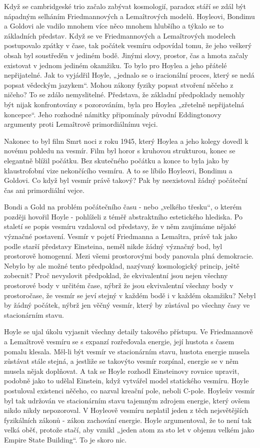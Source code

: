   Když se cambridgeské trio začalo zabývat kosmologií, paradox stáří se zdál být nápadným selháním
  Friedmannových a Lemaîtrových modelů. Hoyleovi, Bondimu a Goldovi ale vadilo mnohem více něco
  mnohem hlubšího a týkalo se to základních představ. Když se ve Friedmannových a Lemaîtrových
  modelech postupovalo zpátky v čase, tak počátek vesmíru odpovídal tomu, že jeho veškerý obsah byl
  soustředěn v jediném bodě. Jinými slovy, prostor, čas a hmota začaly existovat v jednom jediném
  okamžiku. To bylo pro Hoylea a jeho přátelé nepřijatelné. Jak to vyjádřil Hoyle, „jednalo se o
  iracionální proces, který se nedá popsat vědeckým jazykem“. Mohou zákony fyziky popsat stvoření
  něčeho z ničeho? To se zdálo nemyslitelné. Představa, že základní předpoklady nemohly být nijak
  konfrontovány s pozorováním, byla pro Hoylea „zřetelně nepřijatelná koncepce“. Jeho rozhodné
  námitky připomínaly původní Eddingtonovy argumenty proti Lemaîtrově primordiálnímu vejci. 

  Nakonec to byl film Smrt noci z roku 1945, který Hoylea a jeho kolegy dovedl k novému pohledu na
  vesmír. Film byl horor s kruhovou strukturou, konec se elegantně blížil počátku. Bez skutečného
  počátku a konce to byla jako by klaustrofobní vize nekončícího vesmíru. A to se líbilo Hoyleovi,
  Bondimu a Goldovi. Co když byl vesmír právě takový? Pak by neexistoval žádný počáteční čas ani
  primordiální vejce. 

  Bondi a Gold na problém počátečního času - nebo „velkého třesku“, o kterém později hovořil Hoyle -
  pohlíželi z téměř abstraktního estetického hlediska. Po staletí se popis vesmíru vzdaloval od
  představy, že v něm zaujímáme nějaké význačné postavení. Vesmír v pojetí Friedmanna a Lemaîtra,
  právě tak jako podle starší představy Einsteina, neměl nikde žádný význačný bod, byl prostorově
  homogenní. Mezi všemi prostorovými body panovala plná demokracie. Nebylo by ale možné tento
  předpoklad, nazývaný kosmologický princip, ještě zobecnit? Proč nevyslovit předpoklad, že
  ekvivalentní jsou nejen všechny prostorové body v určitém čase, nýbrž že jsou ekvivalentní všechny
  body v prostoročase, že vesmír se jeví stejný v každém bodě i v každém okamžiku? Nebyl by žádný
  počátek, nýbrž jen věčný vesmír, který by zůstával po všechny časy ve stacionárním stavu. 

  Hoyle se ujal úkolu vyjasnit všechny detaily takového přístupu. Ve Friedmannově a Lemaîtrově
  vesmíru se s expanzí rozřeďovala energie, její hustota s časem pomalu klesala. Měl-li být vesmír
  ve stacionárním stavu, hustota energie musela zůstávat stále stejná, a jestliže se takovýto vesmír
  rozpínal, energie se v něm musela nějak doplňovat. A tak se Hoyle rozhodl Einsteinovy rovnice
  upravit, podobně jako to udělal Einstein, když vytvářel model statického vesmíru. Hoyle postuloval
  existenci něčeho, co nazval kreační pole, neboli C-pole. Hoyleův vesmír byl tak udržován ve
  stacionárním stavu tajemným zdrojem energie, který ovšem nikdo nikdy nepozoroval. V Hoyleově
  vesmíru neplatil jeden z těch nejsvětějších fyzikálních zákonů - zákon zachování energie. Hoyle
  argumentoval, že to není tak velká oběť, protože stačí, aby vznikl „jeden atom za sto let v objemu
  velkém jako Empire State Building“. To je skoro nic. 

